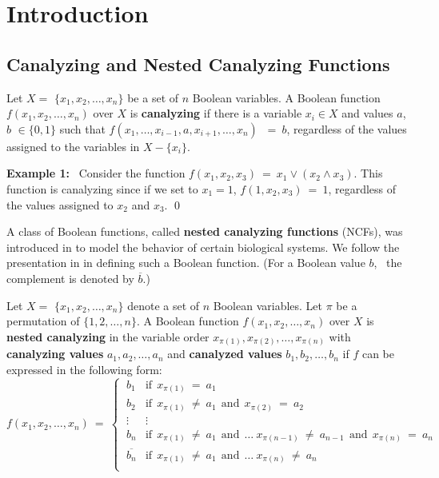\section{Introduction} 
\label{sec:intro}

\subsection{Canalyzing and Nested Canalyzing Functions}
\label{sse:ncf_def}


\begin{definition}\label{def:canalyzing}
Let $X = $ $\{x_1, x_2, \ldots, x_n\}$ be a set of $n$  Boolean variables.
A Boolean function $f(x_1, x_2, \ldots, x_n)$ over $X$ is \textbf{canalyzing}
if there is a variable $x_i \in X$ and values $a$, $b$ $\in \{0,1\}$ such that 
$f(x_1, \ldots, x_{i-1}, a, x_{i+1}, \ldots, x_n)$ $~=~ b$, regardless of the values
assigned to the variables in $X - \{x_i\}$.
\end{definition}

\medskip

\noindent
\textbf{Example 1:}~ Consider the function 
$f(x_1, x_2, x_3) ~=~ x_1 \vee (x_2 \wedge x_3)$.
This function is canalyzing since if we set to $x_1 = 1$,
$f(1, x_2, x_3) ~=~ 1$, regardless of the values assigned to $x_2$ and $x_3$. \qed

\medskip

A class of Boolean functions, called \textbf{nested canalyzing functions} (NCFs),
was introduced in \cite{Kauffman-etal-2003} to model the behavior of
certain biological systems.
We follow the presentation in \cite{Layne-2011} in defining 
such a Boolean function. 
(For a Boolean value $b$,~ the complement is denoted by $\overline{b}$.)

\begin{definition}\label{def:nested_canalyzing}
Let $X = $ $\{x_1, x_2, \ldots, x_n\}$ denote a set of $n$  Boolean variables.
Let $\pi$ be a permutation of $\{1, 2, \ldots, n\}$.
A Boolean function $f(x_1, x_2, \ldots, x_n)$ over $X$ is \textbf{nested canalyzing}
in the variable order $x_{\pi(1)}, x_{\pi(2)}, \ldots, x_{\pi(n)}$ with
\textbf{canalyzing values} $a_1, a_2, \ldots, a_n$ and 
\textbf{canalyzed values} $b_1, b_2, \ldots, b_n$ 
if $f$ can be expressed in the following form:
\[
f(x_1, x_2, \ldots, x_n) ~=~ 
   \begin{cases}
       \:b_1 & \mathrm{if~~} x_{\pi(1)} ~=~ a_1 \\
       \:b_2 & \mathrm{if~~} x_{\pi(1)} ~\neq~ a_1 \mathrm{~~and~~}
            x_{\pi(2)} ~=~ a_2 \\
       \:\vdots & \vdots \\
       \:b_n & \mathrm{if~~} x_{\pi(1)} ~\neq~ a_1 \mathrm{~~and~~} \ldots~
             x_{\pi(n-1)} ~\neq~ a_{n-1} \mathrm{~~and~~} x_{\pi(n)} ~=~ a_n \\
       \:\overline{b_n} & \mathrm{if~~} x_{\pi(1)} ~\neq~ a_1 \mathrm{~~and~~} \ldots~
            x_{\pi(n)} ~\neq~ a_n \\
   \end{cases}
\]
\end{definition}

